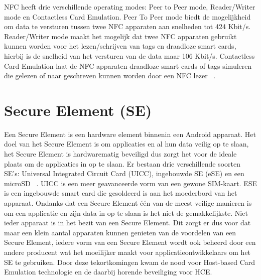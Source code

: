 NFC heeft drie verschillende operating modes: Peer to Peer mode, Reader/Writer mode en Contactless Card Emulation. Peer To Peer mode biedt de mogelijkheid om data te versturen tussen twee NFC apparaten aan snelheden tot 424 Kbit/s. Reader/Writer mode maakt het mogelijk dat twee NFC apparaten gebruikt kunnen worden voor het lezen/schrijven van tags en draadloze smart cards, hierbij is de snelheid van het versturen van de data maar 106 Kbit/s. Contactless Card Emulation laat de NFC apparaten draadloze smart cards of tags simuleren die gelezen of naar geschreven kunnen worden door een NFC lezer ~\autocite{Alattar2014}. 

\section{Secure Element (SE)}
\label{sec:SE}
Een Secure Element is een hardware element binnenin een Android apparaat. Het doel van het Secure Element is om applicaties en al hun data veilig op te slaan, het Secure Element is hardwarematig beveiligd dus zorgt het voor de ideale plaats om de applicaties in op te slaan. Er bestaan drie verschillende soorten SE's: Universal Integrated Circuit Card (UICC), ingebouwde SE (eSE) en een microSD ~\autocite{Borko2014}. UICC is een meer geavanceerde vorm van een gewone SIM-kaart. ESE is een ingebouwde smart card die gesoldeerd is aan het moederbord van het apparaat. Ondanks dat een Secure Element één van de meest veilige manieren is om een applicatie en zijn data in op te slaan is het niet de gemakkelijkste. Niet ieder apparaat is in het bezit van een Secure Element. Dit zorgt er dus voor dat maar een klein aantal apparaten kunnen genieten van de voordelen van een Secure Element, iedere vorm van een Secure Element wordt ook beheerd door een andere producent wat het moeilijker maakt voor applicatieontwikkelaars om het SE te gebruiken. Door deze tekortkomingen kwam de nood voor Host-based Card Emulation technologie en de daarbij horende beveiliging voor HCE.

